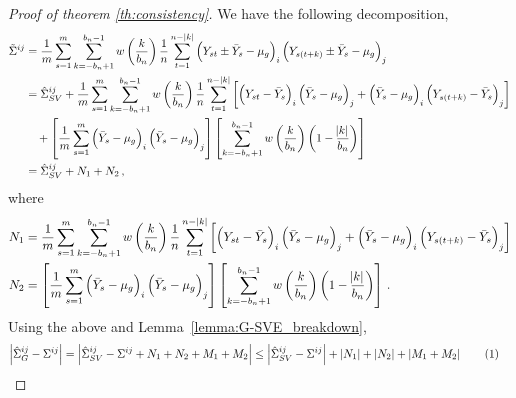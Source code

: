 \documentclass[11pt]{article}
\newcommand\numberthis{\addtocounter{equation}{1}\tag{\theequation}}
\theoremstyle{remark}
\begin{document}
%
\begin{proof}[Proof of theorem \ref{th:consistency}]
We have the following decomposition,
\begin{align*}
\tilde{\Sigma}^{ij}
    & = \dfrac{1}{m}\sum_{s=1}^{m}\sum_{k=-b_n+1}^{b_n-1}w\left(\dfrac{k}{b_n}\right)\dfrac{1}{n}\sum_{t=1}^{n-|k|}  \left(Y_{st} \pm \bar{Y}_s - \mu_g \right)_i  \left(Y_{s(t + k)} \pm \bar{Y}_s - \mu_g \right)_j\\
    & = \hat{\Sigma}_{SV}^{ij} + \dfrac{1}{m}\sum_{s=1}^{m}\sum_{k=-b_n+1}^{b_n-1}w\left(\dfrac{k}{b_n}\right)\dfrac{1}{n}\sum_{t=1}^{n-|k|}\left[ \left(Y_{st} - \bar{Y}_s \right)_i   \left(\bar{Y}_s - \mu_g \right)_j + \left(\bar{Y}_s - \mu_g \right)_i  \left(Y_{s(t+k)} - \bar{Y}_s \right)_j\right]\\
    & \quad + \left[\dfrac{1}{m}  \sum_{s=1}^{m}  \left(\bar{Y}_s - \mu_g \right)_i  \left(\bar{Y}_s - \mu_g \right)_j \right]  \left[\sum_{k=-b_n+1}^{b_n-1}w\left(\dfrac{k}{b_n}\right)\left(1 - \dfrac{\abs{k}}{b_n}\right) \right]\\
    & = \hat{\Sigma}_{SV}^{ij} + N_1 + N_2 \,,
\end{align*}
where
\begin{align*}
N_1 & = \dfrac{1}{m}\sum_{s=1}^{m}  \sum_{k=-b_n+1}^{b_n-1}  w\left(\dfrac{k}{b_n}\right)\dfrac{1}{n}  \sum_{t=1}^{n-|k|}  \left[ \left(Y_{st} - \bar{Y}_s \right)_i  \left(\bar{Y}_s - \mu_g \right)_j + \left(\bar{Y}_s - \mu_g \right)_i  \left(Y_{s(t+k)} - \bar{Y}_s \right)_j\right]\\
N_2 & = \left[\dfrac{1}{m}  \sum_{s=1}^{m}  \left(\bar{Y}_s - \mu_g \right)_i  \left(\bar{Y}_s - \mu_g \right)_j \right]  \left[\sum_{k=-b_n+1}^{b_n-1}w\left(\dfrac{k}{b_n}\right)\left(1 - \dfrac{\abs{k}}{b_n}\right) \right]\,.
\end{align*}
%
Using the above and  Lemma~\ref{lemma:G-SVE_breakdown}, 
\begin{align*}
\left|\hat{\Sigma}_{G}^{ij} - \Sigma^{ij} \right| & = \left| \hat{\Sigma}_{SV}^{ij} - \Sigma^{ij} + N_1 + N_2 + M_1 + M_2 \right|  \leq \left| \hat{\Sigma}_{SV}^{ij} - \Sigma^{ij} \right| +  \left| N_1 \right| +  \left|N_2 \right| + \left| M_1 + M_2 \right| \numberthis \label{eq:G-SVE_full_decomp}

\end{align*}
\end{proof}
\end{document}
